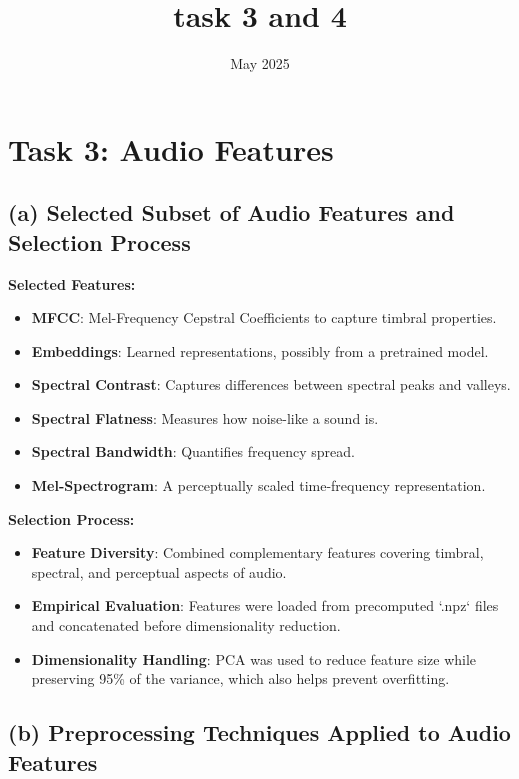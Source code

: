 \documentclass{article}
\title{task 3 and 4}
\date{May 2025}
\begin{document}
\maketitle

\section*{Task 3: Audio Features}

\subsection*{(a) Selected Subset of Audio Features and Selection Process}

\textbf{Selected Features:}
\begin{itemize}
    \item \textbf{MFCC}: Mel-Frequency Cepstral Coefficients to capture timbral properties.
    \item \textbf{Embeddings}: Learned representations, possibly from a pretrained model.
    \item \textbf{Spectral Contrast}: Captures differences between spectral peaks and valleys.
    \item \textbf{Spectral Flatness}: Measures how noise-like a sound is.
    \item \textbf{Spectral Bandwidth}: Quantifies frequency spread.
    \item \textbf{Mel-Spectrogram}: A perceptually scaled time-frequency representation.
\end{itemize}

\textbf{Selection Process:}
\begin{itemize}
    \item \textbf{Feature Diversity}: Combined complementary features covering timbral, spectral, and perceptual aspects of audio.
    \item \textbf{Empirical Evaluation}: Features were loaded from precomputed `.npz` files and concatenated before dimensionality reduction.
    \item \textbf{Dimensionality Handling}: PCA was used to reduce feature size while preserving 95\% of the variance, which also helps prevent overfitting.
\end{itemize}

\subsection*{(b) Preprocessing Techniques Applied to Audio Features}
\end{document}
